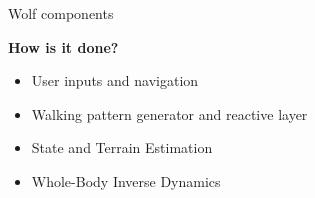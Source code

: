 \begin{myblock}{\large Wolf components}
	
	
	\textbf{How is it done?}\\
	\begin{itemize}
		\item User inputs and navigation
		\item Walking pattern generator and reactive layer
		\item State and Terrain Estimation
		\item Whole-Body Inverse Dynamics
	\end{itemize}
\end{myblock}
